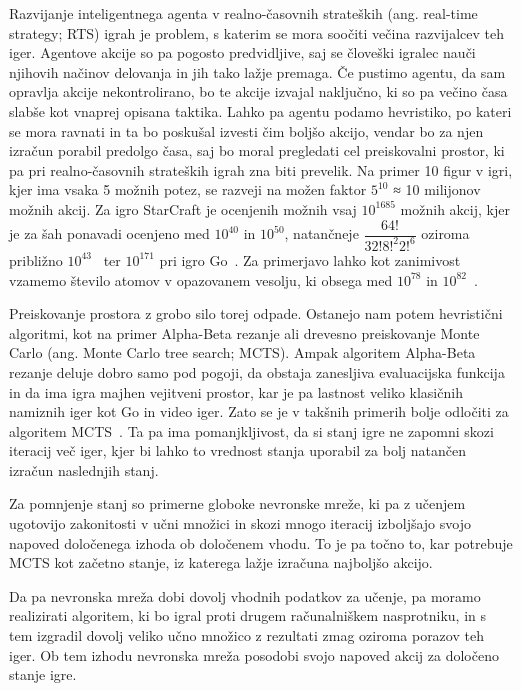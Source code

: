 \documentclass[a4paper, 12pt]{book}
\begin{document}
Razvijanje inteligentnega agenta v realno-časovnih strateških (ang. real-time strategy; RTS) igrah je problem, s katerim se mora soočiti večina razvijalcev teh iger. Agentove akcije so pa pogosto predvidljive, saj se človeški igralec nauči njihovih načinov delovanja in jih tako lažje premaga.
Če pustimo agentu, da sam opravlja akcije nekontrolirano, bo te akcije izvajal naključno, ki so pa večino časa slabše kot vnaprej opisana taktika.
Lahko pa agentu podamo hevristiko, po kateri se mora ravnati in ta bo poskušal izvesti čim boljšo akcijo, vendar bo za njen izračun porabil predolgo časa, saj bo moral pregledati cel preiskovalni prostor, ki pa pri realno-časovnih strateških igrah zna biti prevelik.
Na primer 10 figur v igri, kjer ima vsaka 5 možnih potez, se razveji na možen faktor $5^{10}$ ≈ 10 milijonov možnih akcij.
Za igro StarCraft je ocenjenih možnih vsaj $10^{1685}$ možnih akcij, kjer je za šah ponavadi ocenjeno med $10^{40}$ in $10^{50}$, natančneje $\dfrac{64!}{32!8!^{2}2!^{6}}$ oziroma približno $10^{43}$~\cite{wiki:Shannon_number} ter $10^{171}$ pri igro Go~\cite{ontanon2017combinatorial}.
Za primerjavo lahko kot zanimivost vzamemo število atomov v opazovanem vesolju, ki obsega med $10^{78}$ in $10^{82}$~\cite{atoms}.

Preiskovanje prostora z grobo silo torej odpade. 
Ostanejo nam potem hevristični algoritmi, kot na primer Alpha-Beta rezanje ali drevesno preiskovanje Monte Carlo (ang. Monte Carlo tree search; MCTS). 
Ampak algoritem Alpha-Beta rezanje deluje dobro samo pod pogoji, da obstaja zanesljiva evaluacijska funkcija in da ima igra majhen vejitveni prostor, kar je pa lastnost veliko klasičnih namiznih iger kot Go in video iger. 
Zato se je v takšnih primerih bolje odločiti za algoritem MCTS~\cite{chaslot2008monte}.
Ta pa ima pomanjkljivost, da si stanj igre ne zapomni skozi iteracij več iger, kjer bi lahko to vrednost stanja uporabil za bolj natančen izračun naslednjih stanj.

Za pomnjenje stanj so primerne globoke nevronske mreže, ki pa z učenjem ugotovijo zakonitosti v učni množici in skozi mnogo iteracij izboljšajo svojo napoved določenega izhoda ob določenem vhodu. 
To je pa točno to, kar potrebuje MCTS kot začetno stanje, iz katerega lažje izračuna najboljšo akcijo.

Da pa nevronska mreža dobi dovolj vhodnih podatkov za učenje, pa moramo realizirati algoritem, ki bo igral proti drugem računalniškem nasprotniku, in s tem izgradil dovolj veliko učno množico z rezultati zmag oziroma porazov teh iger. 
Ob tem izhodu nevronska mreža posodobi svojo napoved akcij za določeno stanje igre.
\end{document}
